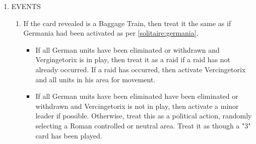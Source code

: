 \begin{enumerate}
\begin{enumerate}[leftmargin=0in]
    On a 1-3 use the card for a political action instead. Randomly determine the target, re-rolling until you find an tribal home area that is either neutral or enemy controlled.

    On a 4-6 move as many German units as possible into an adjacent bot controlled area. An area adjacent to a Roman controlled or neutral area should be prioritized over other areas, and should not result in overstacking. If there is more than one possible area, or terrain or overstacking prevents all German units from moving to a single area, then select the target areas randomly.

    \item When taking losses, bot controlled units not in their home area will take losses prior to units in their home area when they are the same strength. If there are multiple bot controlled barbarian units that could take a point of damage, randomly determine which unit takes the damage.
  \end{enumerate}

  If Ariovistus is part of an attacking force, then attempt to use his special ability before battle if possible.

  If a river prevents all units from attacking the target area, then only two randomly selected units will attack, and the rest will remain in place.

  \item EVENTS

  \begin{enumerate}[leftmargin=0in]
    \item If the card revealed is a Baggage Train, then treat it the same as if Germania had been activated as per \ref{solitaire:germania}.

    \begin{itemize}
    \item If all German units have been eliminated or withdrawn and Vergingetorix is in play, then treat it as a raid if a raid has not already occurred. If a raid has occurred, then activate Vercingetorix and all units in his area for movement.

    \item If all German units have been eliminated have been eliminated or withdrawn and Vercingetorix is not in play, then activate a minor leader if possible. Otherwise, treat this as a political action, randomly selecting a Roman controlled or neutral area. Treat it as though a "3" card has been played.
    \end{itemize}


\end{enumerate}
\end{enumerate}
